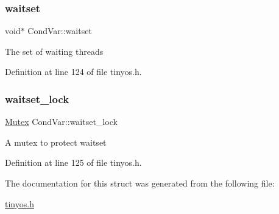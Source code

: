 \subsubsection{\texorpdfstring{waitset}{waitset}}
{\footnotesize\ttfamily void$\ast$ Cond\+Var\+::waitset}

The set of waiting threads 

Definition at line 124 of file tinyos.\+h.

\mbox{\label{structCondVar_a477b855f4d3880d231206ae79bd5b6cf}} 
\subsubsection{\texorpdfstring{waitset\+\_\+lock}{waitset\_lock}}
{\footnotesize\ttfamily \hyperlink{group__syscalls_gaef2ec62cae8e0031fd19fc8b91083ade}{Mutex} Cond\+Var\+::waitset\+\_\+lock}

A mutex to protect {\ttfamily waitset} 

Definition at line 125 of file tinyos.\+h.



The documentation for this struct was generated from the following file\+:\begin{DoxyCompactItemize}
\item 
\hyperlink{tinyos_8h}{tinyos.\+h}\end{DoxyCompactItemize}
